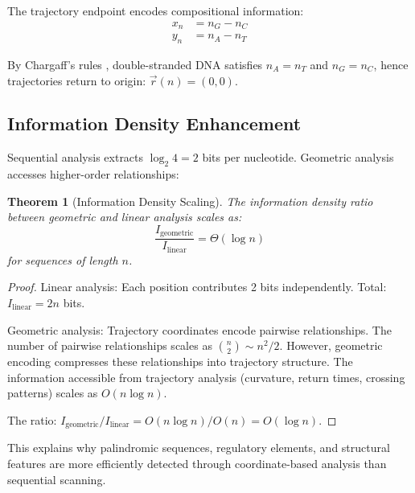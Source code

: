 \documentclass[twocolumn,10pt,a4paper]{article}
\newtheorem{theorem}{Theorem}[section]
\theoremstyle{definition}
\theoremstyle{remark}
\begin{document}
The trajectory endpoint encodes compositional information:
\begin{align}
    x_n &= n_G - n_C \\
    y_n &= n_A - n_T
\end{align}

By Chargaff's rules \cite{chargaff1950}, double-stranded DNA satisfies $n_A = n_T$ and $n_G = n_C$, hence trajectories return to origin: $\vec{r}(n) = (0, 0)$.

\subsection{Information Density Enhancement}

Sequential analysis extracts $\log_2 4 = 2$ bits per nucleotide. Geometric analysis accesses higher-order relationships:

\begin{theorem}[Information Density Scaling]
\label{thm:info_density}
The information density ratio between geometric and linear analysis scales as:
\begin{equation}
    \frac{I_{\text{geometric}}}{I_{\text{linear}}} = \Theta(\log n)
\end{equation}
for sequences of length $n$.
\end{theorem}

\begin{proof}
Linear analysis: Each position contributes 2 bits independently. Total: $I_{\text{linear}} = 2n$ bits.

Geometric analysis: Trajectory coordinates encode pairwise relationships. The number of pairwise relationships scales as $\binom{n}{2} \sim n^2/2$. However, geometric encoding compresses these relationships into trajectory structure. The information accessible from trajectory analysis (curvature, return times, crossing patterns) scales as $O(n \log n)$.

The ratio: $I_{\text{geometric}}/I_{\text{linear}} = O(n \log n)/O(n) = O(\log n)$.
\end{proof}

This explains why palindromic sequences, regulatory elements, and structural features are more efficiently detected through coordinate-based analysis than sequential scanning.
\end{document}
